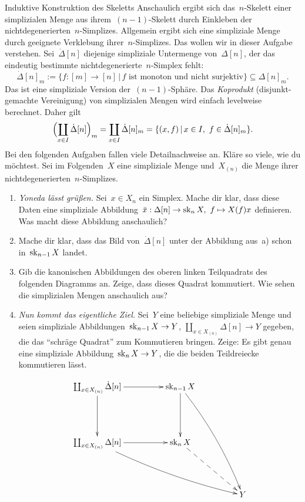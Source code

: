 \documentclass{uebblatt}
\begin{document}
\begin{aufgabe}{Induktive Konstruktion des Skeletts}
Anschaulich ergibt sich das~$n$-Skelett einer simplizialen Menge aus
ihrem~$(n-1)$-Skelett durch Einkleben der nichtdegenerierten~$n$-Simplizes.
Allgemein ergibt sich eine simpliziale Menge durch geeignete Verklebung
ihrer~$n$-Simplizes. Das wollen wir in dieser Aufgabe verstehen.
Sei~$\dot \Delta[n]$ diejenige simpliziale Untermenge von~$\Delta[n]$, der das
eindeutig bestimmte nichtdegenerierte~$n$-Simplex fehlt:
\[ \dot \Delta[n]_m := \{ f : [m] \to [n] \,|\,
  \text{$f$ ist monoton und nicht surjektiv} \} \subseteq \Delta[n]_m. \]
Das ist eine simpliziale Version der~$(n-1)$-Sphäre.
Das \emph{Koprodukt} (disjunkt-gemachte Vereinigung) von simplizialen Mengen
wird einfach levelweise berechnet. Daher gilt
\[ \Bigl(\coprod_{x \in I} \dot\Delta[n]\Bigr)_m =
  \coprod_{x \in I} \dot\Delta[n]_m =
  \{ (x, f) \,|\, x \in I,\ f \in \dot\Delta[n]_m \}. \]
Bei den folgenden Aufgaben fallen viele Detailnachweise an. Kläre so viele, wie
du möchtest. Sei im Folgenden~$X$ eine simpliziale Menge und~$X_{(n)}$ die
Menge ihrer nichtdegenerierten~$n$-Simplizes.

\begin{enumerate}
\item \emph{Yoneda lässt grüßen.} Sei~$x \in X_n$ ein Simplex. Mache dir
klar, dass diese Daten eine simpliziale Abbildung~$\bar x : \Delta[n] \to \operatorname{sk}_n
X,\ f \mapsto X(f)x$ definieren. Was macht diese Abbildung anschaulich?

\item Mache dir klar, dass das Bild von~$\dot\Delta[n]$ unter der Abbildung
aus~a) schon in~$\operatorname{sk}_{n-1} X$ landet.

\item Gib die kanonischen Abbildungen des oberen linken Teilquadrats des folgenden
Diagramms an. Zeige, dass dieses Quadrat kommutiert. Wie sehen die simplizialen
Mengen anschaulich aus?

\item \emph{Nun kommt das eigentliche Ziel.} Sei~$Y$ eine beliebige simpliziale
Menge und seien simpliziale Abbildungen~$\operatorname{sk}_{n-1}X \to Y$, $\coprod_{x \in
X_{(n)}} \Delta[n] \to Y$ gegeben, die das "`schräge Quadrat"' zum Kommutieren
bringen. Zeige: Es gibt genau eine simpliziale Abbildung~$\operatorname{sk}_n X \to Y$, die
die beiden Teildreiecke kommutieren lässt.

\[ \xymatrixcolsep{4pc}\xymatrixrowsep{4pc}\xymatrix{
  \coprod_{x \in X_{(n)}} \dot\Delta[n] \ar[r] \ar[d] &
  \sk_{n-1} X \ar[d] \ar@/^/[rdd] \\
  \coprod_{x \in X_{(n)}} \Delta[n] \ar[r] \ar@/_/[rrd] &
  \sk_n X \ar@{-->}[rd] \\
  && Y
} \]


\end{enumerate}
\end{aufgabe}
\end{document}

